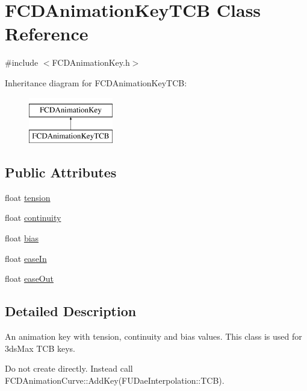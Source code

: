 \hypertarget{classFCDAnimationKeyTCB}{
\section{FCDAnimationKeyTCB Class Reference}
\label{classFCDAnimationKeyTCB}
}


{\ttfamily \#include $<$FCDAnimationKey.h$>$}

Inheritance diagram for FCDAnimationKeyTCB:\begin{figure}[H]
\begin{center}
\leavevmode
\includegraphics[height=2.000000cm]{classFCDAnimationKeyTCB}
\end{center}
\end{figure}
\subsection*{Public Attributes}
\begin{DoxyCompactItemize}
\item 
float \hyperlink{classFCDAnimationKeyTCB_ab1f6045357667b2adff959bb737925f1}{tension}
\item 
float \hyperlink{classFCDAnimationKeyTCB_ac82f078ec71eed7e6ed88dad95e2ad45}{continuity}
\item 
float \hyperlink{classFCDAnimationKeyTCB_a1676e8d6fded46456f042f9fb20e7c1d}{bias}
\item 
float \hyperlink{classFCDAnimationKeyTCB_a256d60dd1899471eae3a633734e7edaa}{easeIn}
\item 
float \hyperlink{classFCDAnimationKeyTCB_a45cdf0eff558ae6b5721a65d072e452f}{easeOut}
\end{DoxyCompactItemize}


\subsection{Detailed Description}
An animation key with tension, continuity and bias values. This class is used for 3dsMax TCB keys.

Do not create directly. Instead call FCDAnimationCurve::AddKey(FUDaeInterpolation::TCB). 

